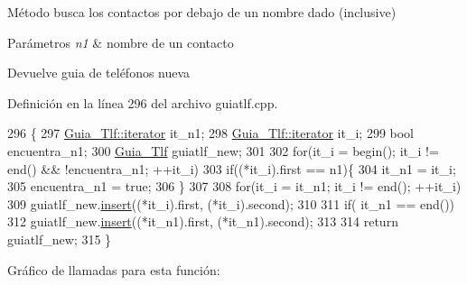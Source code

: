 Método busca los contactos por debajo de un nombre dado (inclusive) 


\begin{DoxyParams}{Parámetros}
{\em n1} & nombre de un contacto \\
\hline
\end{DoxyParams}
\begin{DoxyReturn}{Devuelve}
guia de teléfonos nueva 
\end{DoxyReturn}


Definición en la línea 296 del archivo guiatlf.\+cpp.


\begin{DoxyCode}
296                                                               \{
297     \hyperlink{classGuia__Tlf_1_1iterator}{Guia\_Tlf::iterator} it\_n1;
298     \hyperlink{classGuia__Tlf_1_1iterator}{Guia\_Tlf::iterator} it\_i;
299     \textcolor{keywordtype}{bool} encuentra\_n1;
300     \hyperlink{classGuia__Tlf}{Guia\_Tlf} guiatlf\_new;
301 
302     \textcolor{keywordflow}{for}(it\_i = begin(); it\_i != end() && !encuentra\_n1; ++it\_i)
303         \textcolor{keywordflow}{if}((*it\_i).first == n1)\{
304             it\_n1 = it\_i;
305             encuentra\_n1 = \textcolor{keyword}{true};
306         \}
307 
308    \textcolor{keywordflow}{for}(it\_i = it\_n1; it\_i != end(); ++it\_i)
309        guiatlf\_new.\hyperlink{classGuia__Tlf_add78a6fe5e8090ad6f71bbb160b70f77}{insert}((*it\_i).first, (*it\_i).second);
310     
311     \textcolor{keywordflow}{if}( it\_n1 == end())
312       guiatlf\_new.\hyperlink{classGuia__Tlf_add78a6fe5e8090ad6f71bbb160b70f77}{insert}((*it\_n1).first, (*it\_n1).second);
313 
314    \textcolor{keywordflow}{return} guiatlf\_new;
315 \}
\end{DoxyCode}
Gráfico de llamadas para esta función\+:
